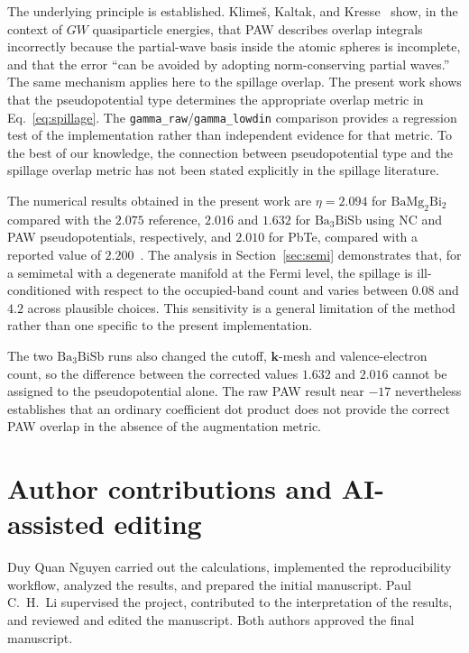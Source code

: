 \documentclass[11pt]{article}
\newcommand{\kk}{\mathbf{k}}
\newcommand{\bmb}{\mathrm{BaMg_2Bi_2}}
\newcommand{\bath}{\mathrm{Ba_3BiSb}}
\begin{document}
\begin{sloppypar}
The underlying principle is established. Klime\v{s}, Kaltak, and
Kresse~\cite{klimes2014} show, in the context of $GW$ quasiparticle energies, that PAW describes
overlap integrals incorrectly because the partial-wave basis inside the atomic spheres is incomplete,
and that the error ``can be avoided by adopting norm-conserving partial waves.'' The same mechanism
applies here to the spillage overlap. The present work shows that the pseudopotential type determines
the appropriate overlap metric in Eq.~\eqref{eq:spillage}. The
\texttt{gamma\_raw}/\texttt{gamma\_lowdin} comparison provides a regression test of the
implementation rather than independent evidence for that metric. To the best of our knowledge, the
connection between pseudopotential type and the spillage overlap metric has not been stated explicitly
in the spillage literature.
\end{sloppypar}

The numerical results obtained in the present work are $\eta=2.094$ for $\bmb$ compared with the
$2.075$ reference, $2.016$ and $1.632$ for $\bath$ using NC and PAW pseudopotentials, respectively,
and $2.010$ for PbTe, compared with a reported value of $2.200$~\cite{li2026}. The analysis in
Section~\ref{sec:semi} demonstrates that, for a semimetal with a degenerate manifold at the Fermi
level, the spillage is ill-conditioned with respect to the occupied-band count and varies between
$0.08$ and $4.2$ across plausible choices. This sensitivity is a
general limitation of the method rather than one specific to the present implementation.

The two $\bath$ runs also changed the cutoff, $\kk$-mesh and valence-electron count, so the difference
between the corrected values $1.632$ and $2.016$ cannot be assigned to the pseudopotential alone. The
raw PAW result near $-17$ nevertheless establishes that an ordinary coefficient dot product does not
provide the correct PAW overlap in the absence of the augmentation metric.

\section*{Author contributions and AI-assisted editing}

Duy Quan Nguyen carried out the calculations, implemented the reproducibility workflow, analyzed the
results, and prepared the initial manuscript. Paul C.~H.~Li supervised the project, contributed to
the interpretation of the results, and reviewed and edited the manuscript. Both authors approved the
final manuscript.
\end{document}
